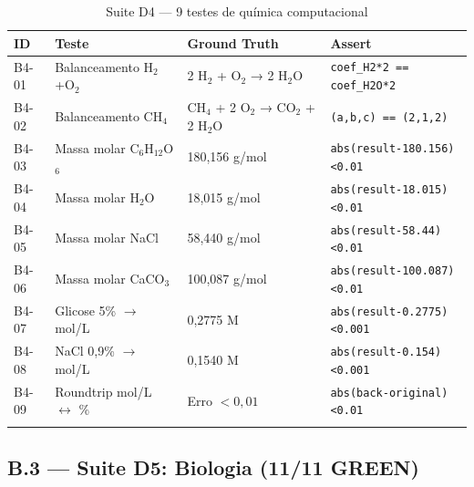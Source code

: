 \documentclass[12pt,a4paper,oneside]{article}
\begin{document}
\begin{longtable}{p{}p{}p{}p{}}
\toprule
\textbf{ID} & \textbf{Teste} & \textbf{Ground Truth} & \textbf{Assert} \\
\midrule
B4-01 & Balanceamento H$_2$+O$_2$ & 2 H$_2$ + O$_2$ → 2 H$_2$O & \texttt{coef\_H2*2 == coef\_H2O*2} \\
B4-02 & Balanceamento CH$_4$ & CH$_4$ + 2 O$_2$ → CO$_2$ + 2 H$_2$O & \texttt{(a,b,c) == (2,1,2)} \\
B4-03 & Massa molar C$_6$H$_{12}$O$_6$ & 180,156 g/mol & \texttt{abs(result-180.156)<0.01} \\
B4-04 & Massa molar H$_2$O & 18,015 g/mol & \texttt{abs(result-18.015)<0.01} \\
B4-05 & Massa molar NaCl & 58,440 g/mol & \texttt{abs(result-58.44)<0.01} \\
B4-06 & Massa molar CaCO$_3$ & 100,087 g/mol & \texttt{abs(result-100.087)<0.01} \\
B4-07 & Glicose 5\% $\to$ mol/L & 0,2775 M & \texttt{abs(result-0.2775)<0.001} \\
B4-08 & NaCl 0,9\% $\to$ mol/L & 0,1540 M & \texttt{abs(result-0.154)<0.001} \\
B4-09 & Roundtrip mol/L $\leftrightarrow$ \% & Erro $<0{,}01$ & \texttt{abs(back-original)<0.01} \\
\bottomrule
\caption{Suite D4 — 9 testes de química computacional}
\end{longtable}

\subsection{B.3 — Suite D5: Biologia (11/11 GREEN)}
\end{document}
